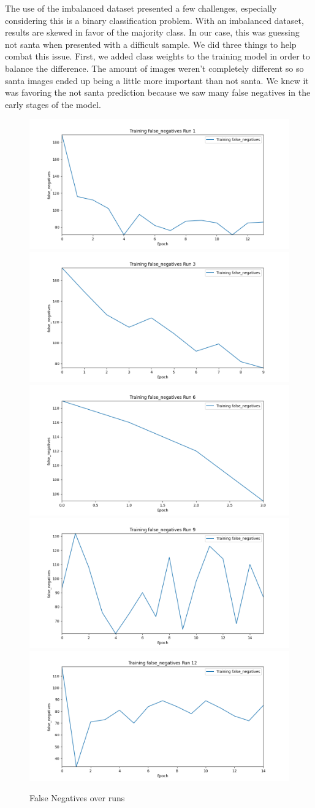 The use of the imbalanced dataset presented a few challenges, especially considering this is a binary classification problem. 
With an imbalanced dataset, results are skewed in favor of the majority class. 
In our case, this was guessing not santa when presented with a difficult sample. 
We did three things to help combat this issue. First, we added class weights to the training model in order to balance the difference. 
The amount of images weren't completely different so so santa images ended up being a little more important than not santa. 
We knew it was favoring the not santa prediction because we saw many false negatives in the early stages of the model. 

\begin{figure}[h]
    \centering
    \includegraphics[width=0.30\linewidth]{img/training_false_negatives_run_1.png}
    \includegraphics[width=0.30\linewidth]{img/training_false_negatives_run_3.png}
    \includegraphics[width=0.30\linewidth]{img/training_false_negatives_run_6.png}
    \includegraphics[width=0.30\linewidth]{img/training_false_negatives_run_9.png}
    \includegraphics[width=0.30\linewidth]{img/training_false_negatives_run_12.png}
    \caption{False Negatives over runs}
    \label{fig:result2}
\end{figure}

